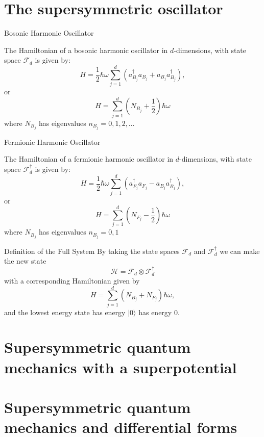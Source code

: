 \documentclass[12pt]{beamer}
\begin{document}
\section[The supersymmetric oscillator]{The supersymmetric oscillator}
\begin{frame}{Bosonic Harmonic Oscillator}
\begin{definition}
The Hamiltonian of a bosonic harmonic oscillator in $d$-dimensions, with state space $\mathcal{F}_d$ is given by:
\begin{displaymath}
H = \frac{1}{2}\hbar\omega\sum_{j=1}^{d} (a^{\dagger}_{B_j}a_{B_j} +a_{B_j}a^{\dagger}_{B_j}), 
\end{displaymath}
or 
\begin{displaymath}
H  = \sum_{j=1}^{d}(N_{B_j}+\frac{1}{2})\hbar\omega
\end{displaymath}
where $N_{B_j}$ has eigenvalues $n_{B_j}=0,1,2,\dots$
\end{definition}
\end{frame}
\begin{frame}{Fermionic Harmonic Oscillator}
\begin{definition}
The Hamiltonian of a fermionic harmonic oscillator in $d$-dimensions, with state space $\mathcal{F}^{\dagger}_d$ is given by:
\begin{displaymath}
H = \frac{1}{2}\hbar\omega \sum_{j=1}^{d} (a^{\dagger}_{F_j}a_{F_j} - a_{B_j}a^{\dagger}_{B_j}), 
\end{displaymath}
or 
\begin{displaymath}
H  = \sum_{j=1}^{d}(N_{F_j}-\frac{1}{2})\hbar\omega
\end{displaymath}
where $N_{B_j}$ has eigenvalues $n_{B_j}=0,1$
\end{definition}
\end{frame}
\begin{frame}{Definition of the Full System}
By taking the state spaces $\mathcal{F}_d$ and $\mathcal{F}^{\dagger}_d$ we can make the new state
\begin{displaymath}
  \mathcal{H} = \mathcal{F}_d\otimes\mathcal{F}^{\dagger}_d
\end{displaymath}
with a corresponding Hamiltonian given by
\begin{displaymath}
  H = \sum_{j=1}^{d}(N_{B_j}+N_{F_j})\hbar\omega,
\end{displaymath}
and the lowest energy state has energy $|0\rangle$ has energy $0$.
\end{frame}

\section[Supersymmetric quantum mechanics with a superpotential]{Supersymmetric quantum mechanics with a superpotential}
\begin{frame}
	
\end{frame}

\section[Supersymmetric quantum mechanics and differential forms]{Supersymmetric quantum mechanics and differential forms}
\end{document}
